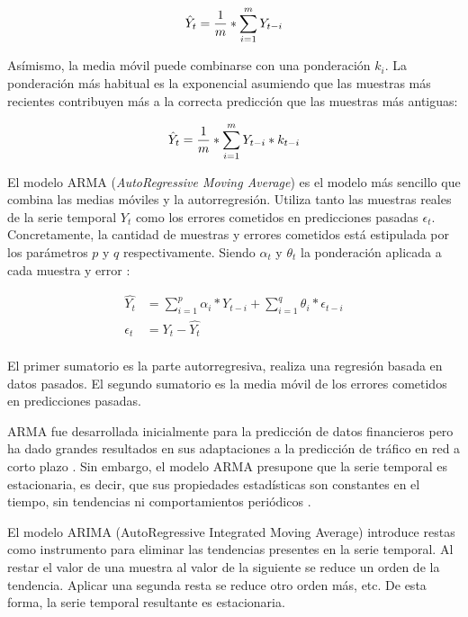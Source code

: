 \begin{equation*}
	\centering
	\hat{Y}_{t} = \frac{1}{m} * \sum_{i=1}^{m} Y_{t-i}
	\label{eq:ma}
\end{equation*}

Asímismo, la media móvil puede combinarse con una ponderación $k_i$. La ponderación más habitual es la exponencial asumiendo que las muestras más recientes contribuyen más a la correcta predicción que las muestras más antiguas:

\begin{equation*}
	\centering
	\hat{Y}_{t} = \frac{1}{m} * \sum_{i=1}^{m} Y_{t-i} * k_{t-i}
\end{equation*}

El modelo ARMA (\textit{AutoRegressive Moving Average}) es el modelo más sencillo que combina las medias móviles y la autorregresión. Utiliza tanto las muestras reales de la serie temporal $Y_t$  como los errores cometidos en predicciones pasadas $\epsilon_t$. Concretamente, la cantidad de muestras y errores cometidos está estipulada por los parámetros $p$ y $q$ respectivamente. Siendo $\alpha_t$ y $\theta_t$ la ponderación aplicada a cada muestra y error \cite{machinelearningbook,arma, arma3}:

\begin{align*}
	\hat{Y_t} &= \sum_{i=1}^{p} \alpha_i * Y_{t-i}  +  \sum_{i=1}^{q} \theta_i * \epsilon_{t-i}\\
	\epsilon_t &= Y_t - \hat{Y_t}\\
\end{align*}

El primer sumatorio es la parte autorregresiva, realiza una regresión basada en datos pasados. El segundo sumatorio es la media móvil de los errores cometidos en predicciones pasadas.

ARMA fue desarrollada inicialmente para la predicción de datos financieros \cite{arma1} pero ha dado grandes resultados en sus adaptaciones a la predicción de tráfico en red a corto plazo \cite{arma2,arima1}. Sin embargo, el modelo ARMA presupone que la serie temporal es estacionaria, es decir, que sus propiedades estadísticas son constantes en el tiempo, sin tendencias ni comportamientos periódicos \cite{machinelearningbook}.

El modelo ARIMA (AutoRegressive Integrated Moving Average) introduce restas como instrumento para eliminar las tendencias presentes en la serie temporal. Al restar el valor de una muestra al valor de la siguiente se reduce un orden de la tendencia. Aplicar una segunda resta se reduce otro orden más, etc. De esta forma, la serie temporal resultante es estacionaria.

